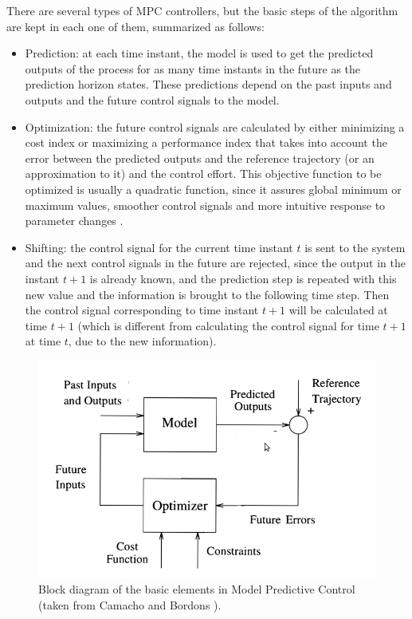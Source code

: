 There are several types of MPC controllers, but the basic steps of the algorithm are kept in each one of them, summarized as follows:

\begin{itemize}

\item Prediction: at each time instant, the model is used to get the predicted outputs of the process for as many time instants in the future as the prediction horizon states. These predictions depend on the past inputs and outputs and the future control signals to the model.

\item Optimization: the future control signals are calculated by either minimizing a cost index or maximizing a performance index that takes into account the error between the predicted outputs and the reference trajectory (or an approximation to it) and the control effort. This objective function to be optimized is usually a quadratic function, since it assures global minimum or maximum values, smoother control signals and more intuitive response to parameter changes \cite{Hovd2004}.

\item Shifting: the control signal for the current time instant $t$ is sent to the system and the next control signals in the future are rejected, since the output in the instant $t + 1$ is already known, and the prediction step is repeated with this new value and the information is brought to the following time step. Then the control signal corresponding to time instant    $t + 1$ will be calculated at time $t + 1$ (which is different from calculating the control signal for time $t + 1$ at time $t$, due to the new information).

\end{itemize}

\begin{figure}[h!]
\centering
\includegraphics[scale=0.4]{Images/Chapter2/mpc.png}
\caption{Block diagram of the basic elements in Model Predictive Control (taken from Camacho and Bordons \cite{CamachoBordons}).}
\label{fig:mpc_diagram}
\end{figure}

